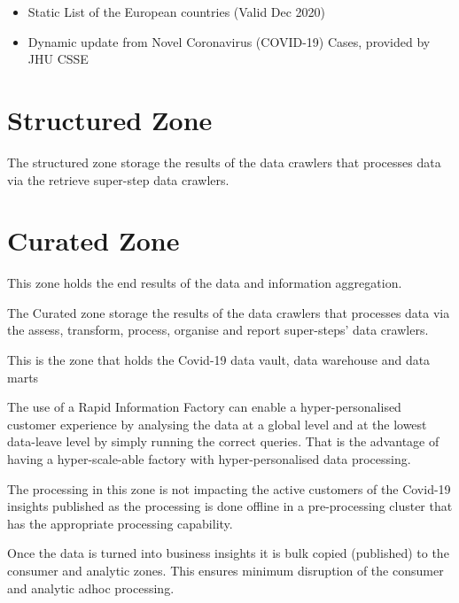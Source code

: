 \begin{itemize}
    \item Static List of the European countries (Valid Dec 2020)
    \item Dynamic update from Novel Coronavirus (COVID-19) Cases, provided by JHU CSSE 
\end{itemize}


\section{Structured Zone}

The structured zone storage the results of the data crawlers that processes data via the retrieve super-step data crawlers.



\section{Curated Zone}
This zone holds the end results of the data and information aggregation.

The Curated zone storage the results of the data crawlers that processes data via the assess, transform, process, organise and report super-steps' data crawlers.

This is the zone that holds the Covid-19 data vault, data warehouse and data marts


The use of a Rapid Information Factory can enable a hyper-personalised customer experience by analysing the data at a global level and at the lowest data-leave level by simply running the correct queries. That is the advantage of having a hyper-scale-able factory with hyper-personalised data processing.

The processing in this zone is not impacting the active customers of the Covid-19 insights published as the processing is done offline in a pre-processing cluster that has the appropriate processing capability.

Once the data is turned into business insights it is bulk copied (published) to the consumer and analytic zones. This ensures minimum disruption of the consumer and analytic adhoc processing.


